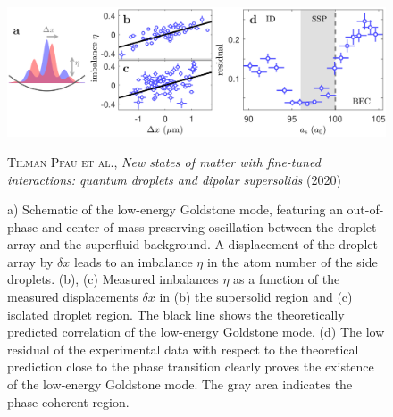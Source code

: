\begin{figure}[H]
    \centering
    \includegraphics[width=1.0\textwidth]{IMAGE/goldstone_mode.png}\\
    \caption{
        a) Schematic of the low-energy Goldstone mode, featuring an out-of-phase
        and center of mass preserving oscillation between the droplet array and the superfluid
        background. A displacement of the droplet array by $\delta x$ leads to an imbalance $\eta$ in the
        atom number of the side droplets.
        (b), (c) Measured imbalances $\eta$ as a function of the
        measured displacements $\delta x$ in (b) the supersolid region and (c) isolated droplet region.
        The black line shows the theoretically predicted correlation of the low-energy Goldstone mode.
        (d) The low residual of the experimental data with respect to the theoretical
        prediction close to the phase transition clearly proves the existence of the low-energy
        Goldstone mode. The gray area indicates the phase-coherent region.
      }
    \textsc{Tilman Pfau et al.}, \emph{New states of matter with fine-tuned interactions:
        quantum droplets and dipolar supersolids} (2020)
    \label{fig:goldstone_mode}
\end{figure}

